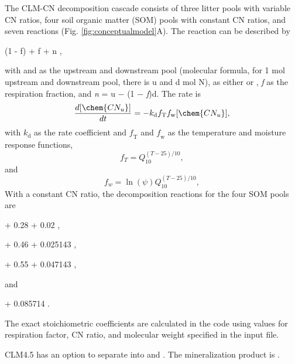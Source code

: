 \documentclass[gmd, manuscript]{copernicus}
\begin{document}
The CLM-CN decomposition cascade consists of three litter pools with variable
CN ratios, four soil organic matter (SOM) pools with constant CN ratios, and
seven reactions (Fig. \ref{fig:conceptualmodel}A). The reaction can be
described by
\begin{reaction}
 \rightarrow (1 - f)  + f  + n ,
\label{rxn:decomp}
\end{reaction}
with  and  as the upstream and downstream pool (molecular
formula, for 1 mol upstream and downstream pool, there is u and d mol N),
 as either  or , \textit{f} as the
respiration fraction, and \textit{n} = u $-$ (1 $-$ \textit{f})d. The rate is
\begin{equation}
\frac{d [\chem{CN_u}]}{d t} = - k_\text{d} f_\text{T} f_\text{w} [\chem{CN_u}],
\label{eq:decomprate}
\end{equation}
with $\textit{k}_\text{d}$ as the rate coefficient and $\textit{f}_\text{T}$
and $\textit{f}_\text{w}$ as the temperature and moisture response functions,
\begin{equation}
f_T = Q_{10}^{(T - 25)/10}, 
\end{equation}
and
\begin{equation}
f_w = \ln(\psi)Q_{10}^{(T - 25)/10}, 
\end{equation}
With a constant CN ratio, the decomposition reactions for the four SOM pools are 
\begin{reaction}
   + 0.28  + 0.02 ,
\label{rxn:som1}
\end{reaction}
\begin{reaction}
   + 0.46  + 0.025143 ,
\label{rxn:som2}
\end{reaction}
\begin{reaction}
   + 0.55  + 0.047143 ,
\label{rxn:som3}
\end{reaction}
and
\begin{reaction}
 \rightarrow {} + 0.085714 .
\label{rxn:som4}
\end{reaction}
The exact stoichiometric coefficients are calculated in the code using values
for respiration factor, CN ratio, and molecular weight specified in the input
file.

CLM4.5 has an option to separate  into  and .
The  mineralization product is .
\end{document}
